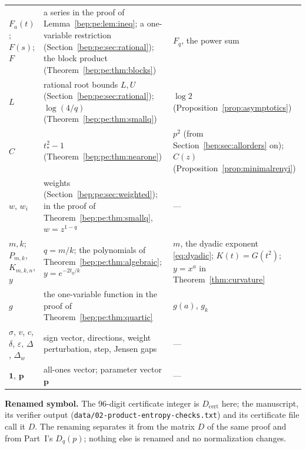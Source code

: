 \documentclass[11pt]{article}
\numberwithin{equation}{section}
\theoremstyle{definition}
\theoremstyle{remark}
\newcommand{\p}{\boldsymbol p}
\newcommand{\one}{\boldsymbol 1}
\begin{document}
\begin{longtable}{@{}>{\raggedright\arraybackslash}p{}
 >{\raggedright\arraybackslash}p{}
 >{\raggedright\arraybackslash}p{}@{}}
$F_a(t)$; $F(s)$; $F$ & a series in the proof of
 Lemma~\ref{bep:pe:lem:ineq}; a one-variable restriction
 (Section~\ref{bep:pe:sec:rational}); the block product
 (Theorem~\ref{bep:pe:thm:blocks}) & $F_q$, the power sum\\
$L$ & rational root bounds $L,U$ (Section~\ref{bep:pe:sec:rational});
 $\log(4/q)$ (Theorem~\ref{bep:pe:thm:smallq}) & $\log2$
 (Proposition~\ref{prop:asymptotics})\\
$C$ & $t_*^2-1$ (Theorem~\ref{bep:pe:thm:nearone}) & $p^2$ (from Section~\ref{bep:sec:allorders} on);
 $C(z)$ (Proposition~\ref{prop:minimalrenyi})\\
$w$, $w_i$ & weights (Section~\ref{bep:pe:sec:weighted}); in the proof of
 Theorem~\ref{bep:pe:thm:smallq}, $w=z^{1-q}$ & ---\\
$m,k$; $P_{m,k}$, $K_{m,k,n}$, $y$ & $q=m/k$; the polynomials of
 Theorem~\ref{bep:pe:thm:algebraic}; $y=e^{-2t_q/k}$ & $m$, the dyadic
 exponent \eqref{eq:dyadic}; $K(t)=G(t^2)$; $y=x^a$ in
 Theorem~\ref{thm:curvature}\\
$g$ & the one-variable function in the proof of
 Theorem~\ref{bep:pe:thm:quartic} & $g(a)$, $g_k$\\
$\sigma$, $v$, $c$, $\delta$, $\varepsilon$, $\Delta$, $\Delta_w$ & sign
 vector, directions, weight perturbation, step, Jensen gaps & ---\\
$\one$, $\p$ & all-ones vector; parameter vector $\boldsymbol p$ & ---\\
\bottomrule
\end{longtable}
\endgroup

\noindent\textbf{Renamed symbol.} The 96-digit certificate integer is
$D_{\mathrm{cert}}$ here; the manuscript, its verifier output
(\nolinkurl{data/02-product-entropy-checks.txt}) and its certificate file
call it $D$. The renaming separates it from the matrix $D$ of the same
proof and from Part~I's $D_q(p)$; nothing else is renamed and no
normalization changes.
\end{document}
